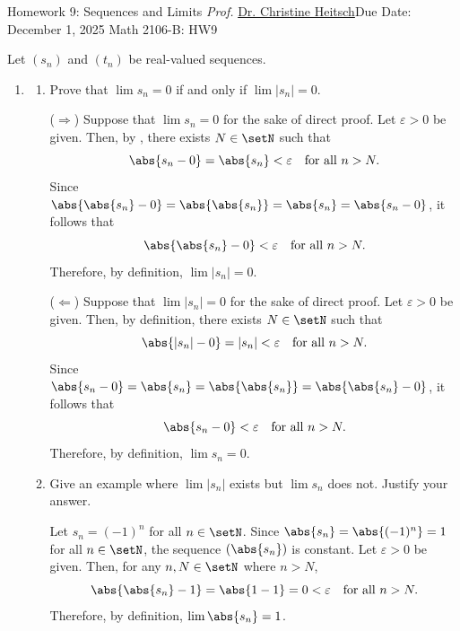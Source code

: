 \newpage{}
{Homework 9: Sequences and Limits}
{\textit{Prof.} \href{https://ceheitsch.github.io/webpage/}{Dr. Christine Heitsch}}{Due Date: December 1, 2025}
{Math 2106-B: HW9}


\newpage
Let \((s_n)\) and \((t_n)\) be real-valued sequences.
\begin{enumerate}
  \item 
  \begin{enumerate}
    \item Prove that \(\lim s_n = 0\) if and only if \(\lim |s_n| = 0\).
    \begin{subprove}
      (\(\Rightarrow\)) Suppose that \(\lim s_n = 0\) for the sake of direct proof.
      Let \(\varepsilon > 0\) be given. Then, by ,
      there exists \(N \in \setN\) such that 
      \[
        \abs{s_n - 0} = \abs{s_n} < \varepsilon \quad\text{for all } n > N.
      \]
      Since \(\abs{\abs{s_n} - 0} = \abs{\abs{s_n}} = \abs{s_n} = \abs{s_n - 0}\), it follows that
      \[
        \abs{\abs{s_n} - 0} < \varepsilon \quad\text{for all } n > N.
      \]
      Therefore, by definition, \(\lim |s_n| = 0\).

      (\(\Leftarrow\)) Suppose that \(\lim |s_n| = 0\) for the sake of direct proof.
      Let \(\varepsilon > 0\) be given. Then, by definition,
      there exists \(N \in \setN\) such that 
      \[
        \abs{|s_n| - 0} = |s_n| < \varepsilon \quad\text{for all } n > N.
      \]
      Since \(\abs{s_n - 0} = \abs{s_n} = \abs{\abs{s_n}} = \abs{\abs{s_n}-0}\), it follows that
      \[
        \abs{s_n - 0} < \varepsilon \quad\text{for all } n > N.
      \]
      Therefore, by definition, \(\lim s_n = 0\).
    \end{subprove}
    \item Give an example where \(\lim |s_n|\) exists but \(\lim s_n\) does not. 
    Justify your answer.
    \begin{subanswer}
      Let \(s_n = (-1)^n\) for all \(n \in \setN\).
      Since \(\abs{s_n} = \abs{(-1)^n} = 1\) for all \(n \in \setN\), the sequence \((\abs{s_n})\) is constant.
      Let \(\varepsilon > 0\) be given. Then, 
      for any \(n, N \in \setN\) where \(n > N\), 
      \[
        \abs{\abs{s_n} - 1} = \abs{1 - 1} = 0 < \varepsilon \quad\text{for all } n > N.
      \]
      Therefore, by definition, \(\lim \abs{s_n} = 1\).
      

\end{subanswer}
\end{enumerate}
\end{enumerate}
